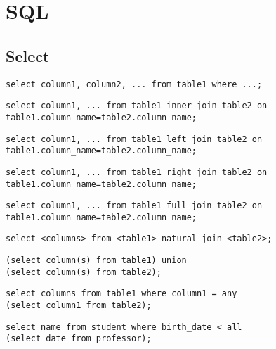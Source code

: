 \section{SQL}

\subsection{Select}

\lstset{language=SQL}

\begin{lstlisting}[caption=select example]
select column1, column2, ... from table1 where ...; 
\end{lstlisting}

\begin{lstlisting}[caption=inner join example]
select column1, ... from table1 inner join table2 on table1.column_name=table2.column_name;
\end{lstlisting}

\begin{lstlisting}[caption=left join example]
select column1, ... from table1 left join table2 on table1.column_name=table2.column_name;
\end{lstlisting}

\begin{lstlisting}[caption=right join example]
select column1, ... from table1 right join table2 on table1.column_name=table2.column_name;
\end{lstlisting}

\begin{lstlisting}[caption=full join example]
select column1, ... from table1 full join table2 on table1.column_name=table2.column_name;
\end{lstlisting}

\begin{lstlisting}[caption=natural join]
select <columns> from <table1> natural join <table2>;
\end{lstlisting}

\begin{lstlisting}[caption=union example]
(select column(s) from table1) union 
(select column(s) from table2);
\end{lstlisting}

\begin{lstlisting}[caption=any example]
select columns from table1 where column1 = any 
(select column1 from table2);
\end{lstlisting}

\begin{lstlisting}[caption=all example]
select name from student where birth_date < all 
(select date from professor);
\end{lstlisting}

